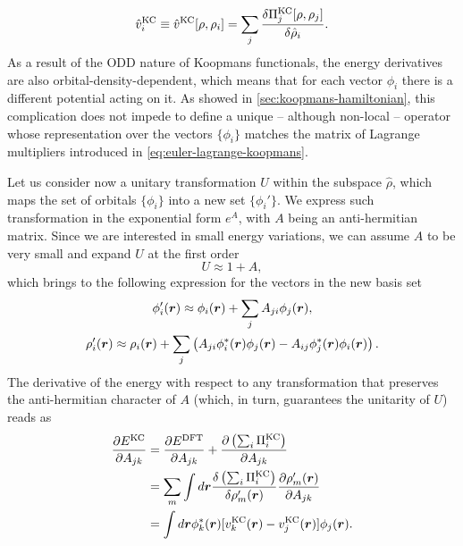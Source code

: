 %
\begin{equation}
    \hat{v}^{\rm KC}_i \equiv \hat{v}^{\rm KC}[\rho,\rho_i] = \sum_j \frac{\delta \Pi_j^{\rm KC}[\rho,\rho_j]}{\delta \hat{\rho}_i} .
    \label{eq:koopmans-ith-potential}
\end{equation}
%
As a result of the ODD nature of Koopmans functionals, the energy derivatives are also orbital-density-dependent, which means that for each vector $\phi_i$ there is a different potential acting on it. As showed in \cref{sec:koopmans-hamiltonian}, this complication does not impede to define a unique -- although non-local -- operator whose representation over the vectors $\{ \phi_i \}$ matches the matrix of Lagrange multipliers introduced in \cref{eq:euler-lagrange-koopmans}.

Let us consider now a unitary transformation $U$ within the subspace $\hat{\rho}$, which maps the set of orbitals $\{ \phi_i \}$ into a new set $\{ \phi_i' \}$. We express such transformation in the exponential form $e^A$, with $A$ being an anti-hermitian matrix. Since we are interested in small energy variations, we can assume $A$ to be very small and expand $U$ at the first order
%
\begin{equation}
    U \approx 1 + A ,
    \label{eq:infinitesimal-unitary}
\end{equation}
%
which brings to the following expression for the vectors in the new basis set
%
\begin{equation}
    \begin{gathered}
    \phi_i'({\bm r}) \approx \phi_i({\bm r}) + \sum_j A_{ji} \phi_j({\bm r}) ,\\
    \rho_i'({\bm r}) \approx \rho_i({\bm r}) + \sum_j \left( A_{ji} \phi_i^*({\bm r}) \phi_j({\bm r}) - A_{ij} \phi_j^*({\bm r}) \phi_i({\bm r}) \right) .
    \end{gathered}
    \label{eq:infinitesimal-unitary-orbitals}
\end{equation}
%
The derivative of the energy with respect to any transformation that preserves the anti-hermitian character of $A$ (which, in turn, guarantees the unitarity of $U$) reads as
%
\begin{equation}
    \begin{split}
    \frac{\partial E^{\rm KC}}{\partial A_{jk}} &= \frac{\partial E^{\rm DFT}}{\partial A_{jk}} + \frac{\partial \left( \sum_i \Pi^{\rm KC}_i \right)}{\partial A_{jk}} \\
    &= \sum_{m} \int d{\bm r} \frac{\delta \left( \sum_i \Pi^{\rm KC}_i \right)}{\delta \rho_m'({\bm r})} \frac{\partial \rho_m'({\bm r})}{\partial A_{jk}} \\
    &= \int d{\bm r} \phi_k^*({\bm r}) [ v^{\rm KC}_k({\bm r}) - v^{\rm KC}_j({\bm r}) ] \phi_j({\bm r}) .
    \end{split}
    \label{eq:energy-der-unitary}
\end{equation}

